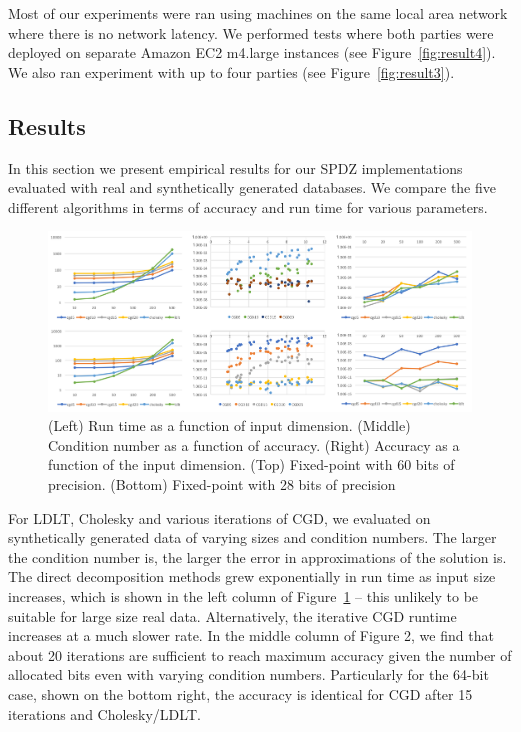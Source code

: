 \documentclass{article}
\begin{document}
Most of our experiments were ran using machines on the same local area network where there is no network latency. We performed tests where both parties were deployed on separate Amazon EC2 m4.large instances (see Figure~\ref{fig:result4}).
We also ran experiment with up to four parties (see Figure~\ref{fig:result3}).


\subsection{Results}

In this section we present empirical results for our SPDZ implementations evaluated with real and synthetically generated databases. We compare the five different algorithms in terms of accuracy and run time for various parameters. 

\begin{figure}[h!]
\centering
  \includegraphics[scale=0.4]{allregression.png}
    \caption{(Left) Run time as a function of input dimension. (Middle) Condition number as a function of accuracy. (Right) Accuracy as a function of the input dimension. (Top) Fixed-point with 60 bits of precision. (Bottom) Fixed-point with 28 bits of precision}
   \label{fig:result1}   
\end{figure}

For LDLT, Cholesky and various iterations of CGD, we evaluated on synthetically generated data of varying sizes and condition numbers. The larger the condition number is, the larger the error in approximations of the solution is. The direct decomposition methods grew exponentially in run time as input size increases, which is shown in the left column of Figure~\ref{fig:result1} -- this unlikely to be suitable for large size real data. Alternatively, the iterative CGD runtime increases at a much slower rate. In the middle column of Figure 2, we find that about 20 iterations are sufficient to reach maximum accuracy given the number of allocated bits even with varying condition numbers. Particularly for the 64-bit case, shown on the bottom right, the accuracy is identical for CGD after 15 iterations and Cholesky/LDLT.
\end{document}
